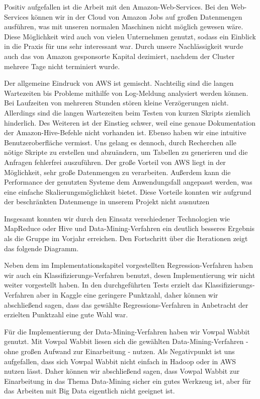Positiv aufgefallen ist die Arbeit mit den Amazon-Web-Services.
Bei den Web-Services können wir in der Cloud von Amazon Jobs auf großen Datenmengen ausführen, was mit unseren normalen Maschinen nicht möglich gewesen wäre.
Diese Möglichkeit wird auch von vielen Unternehmen genutzt, sodass ein Einblick in die Praxis für uns sehr interessant war.
Durch unsere Nachlässigkeit wurde auch das von Amazon gesponsorte Kapital dezimiert,
nachdem der Cluster mehrere Tage nicht terminiert wurde.

Der allgemeine Eindruck von AWS ist gemischt. 
Nachteilig sind die langen Wartezeiten bis Probleme mithilfe von Log-Meldung
analysiert werden können. 
Bei Laufzeiten von mehreren Stunden stören kleine Verzögerungen nicht.
Allerdings sind die langen Wartezeiten beim Testen von kurzen Skripts
ziemlich hinderlich. 
Des Weiteren ist der Einstieg schwer, weil eine genaue Dokumentation der Amazon-Hive-Befehle nicht vorhanden ist.
Ebenso haben wir eine intuitive Benutzeroberfläche vermisst.
Uns gelang es dennoch, durch Recherchen alle nötige Skripte zu erstellen und abzuändern, um Tabellen zu generieren und die Anfragen fehlerfrei auszuführen.
Der große Vorteil von AWS liegt in der Möglichkeit, sehr große Datenmengen zu verarbeiten.
Außerdem kann die Performance der genutzten Systeme dem 
Anwendungsfall angepasst werden, was eine einfache Skalierungsmöglichkeit bietet.
Diese Vorteile konnten wir aufgrund der beschränkten Datenmenge in unserem
Projekt nicht ausnutzen

Insgesamt konnten wir durch den Einsatz verschiedener Technologien wie MapReduce oder Hive und Data-Mining-Verfahren ein deutlich besseres Ergebnis als die Gruppe im Vorjahr erreichen. Den Fortschritt über die Iterationen zeigt das folgende Diagramm.

Neben dem im Implementationskapitel vorgestellten Regression-Verfahren haben wir auch ein Klassifizierungs-Verfahren benutzt,
desen Implementierung wir nicht weiter vorgestellt haben. In den durchgeführten Tests erzielt das Klassifizierungs-Verfahren
aber in Kaggle eine geringere Punktzahl, daher können wir abschließend sagen, dass das gewählte Regressions-Verfahren in
Anbetracht der erzielten Punktzahl eine gute Wahl war.

Für die Implementierung der Data-Mining-Verfahren haben wir Vowpal Wabbit genutzt. Mit Vowpal Wabbit liesen sich die
gewählten Data-Mining-Verfahren - ohne großen Aufwand zur Einarbeitung - nutzen. Als Negativpunkt ist uns aufgefallen, dass
sich Vowpal Wabbit nicht einfach in Hadoop oder in AWS nutzen lässt. Daher können wir abschließend sagen, dass Vowpal Wabbit
zur Einarbeitung in das Thema Data-Mining sicher ein gutes Werkzeug ist, aber für das Arbeiten mit Big Data eigentlich nicht
geeignet ist.

